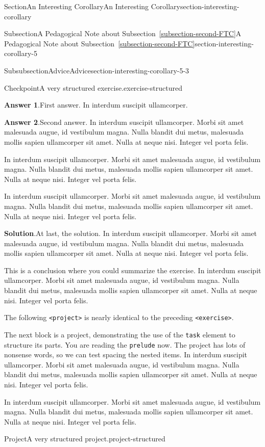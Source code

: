 \documentclass[twoside,10pt,]{article}
\newcommand{\blocktitlefont}{\relax}
\newcommand{\xreffont}{\relax}
\newcommand{\mono}[1]{\texttt{#1}}
\numberwithin{equation}{section}
\begin{document}
\begin{sectionptx}{Section}{An Interesting Corollary}{}{An Interesting Corollary}{}{}{section-interesting-corollary}
\begin{subsectionptx}{Subsection}{A Pedagogical Note about Subsection~{\xreffont\ref*{subsection-second-FTC}}}{}{A Pedagogical Note about Subsection~{\xreffont\ref*{subsection-second-FTC}}}{}{}{section-interesting-corollary-5}
\begin{subsubsectionptx}{Subsubsection}{Advice}{}{Advice}{}{}{section-interesting-corollary-5-3}
\begin{inlineexercise}{Checkpoint}{A very structured exercise.}{exercise-structured}
\begin{enumerate}[font=\bfseries,label=(\alph*),ref=\alph*]
\noindent\textbf{\blocktitlefont Answer 1}.\hypertarget{exercise-structured-6-3}{}\quad{}First answer.  In interdum suscipit ullamcorper.%
\par\smallskip%
\noindent\textbf{\blocktitlefont Answer 2}.\hypertarget{exercise-structured-6-4}{}\quad{}Second answer.  In interdum suscipit ullamcorper. Morbi sit amet malesuada augue, id vestibulum magna. Nulla blandit dui metus, malesuada mollis sapien ullamcorper sit amet. Nulla at neque nisi. Integer vel porta felis.%
\par
In interdum suscipit ullamcorper. Morbi sit amet malesuada augue, id vestibulum magna. Nulla blandit dui metus, malesuada mollis sapien ullamcorper sit amet. Nulla at neque nisi. Integer vel porta felis.%
\par
In interdum suscipit ullamcorper. Morbi sit amet malesuada augue, id vestibulum magna. Nulla blandit dui metus, malesuada mollis sapien ullamcorper sit amet. Nulla at neque nisi. Integer vel porta felis.%
\par\smallskip%
\noindent\textbf{\blocktitlefont Solution}.\hypertarget{exercise-structured-6-5}{}\quad{}At last, the solution.  In interdum suscipit ullamcorper. Morbi sit amet malesuada augue, id vestibulum magna. Nulla blandit dui metus, malesuada mollis sapien ullamcorper sit amet. Nulla at neque nisi. Integer vel porta felis.%
\end{enumerate}%
This is a conclusion where you could summarize the exercise.  In interdum suscipit ullamcorper. Morbi sit amet malesuada augue, id vestibulum magna. Nulla blandit dui metus, malesuada mollis sapien ullamcorper sit amet. Nulla at neque nisi. Integer vel porta felis.%
\end{inlineexercise}%
The following \mono{<project>} is nearly identical to the preceding \mono{<exercise>}.%
\par
The next block is a project, demonstrating the use of the \mono{task} element to structure its parts.  You are reading the \mono{prelude} now.  The project has lots of nonsense words, so we can test spacing the nested items.  In interdum suscipit ullamcorper. Morbi sit amet malesuada augue, id vestibulum magna. Nulla blandit dui metus, malesuada mollis sapien ullamcorper sit amet. Nulla at neque nisi. Integer vel porta felis.%
\par
In interdum suscipit ullamcorper. Morbi sit amet malesuada augue, id vestibulum magna. Nulla blandit dui metus, malesuada mollis sapien ullamcorper sit amet. Nulla at neque nisi. Integer vel porta felis.%
\begin{project}{Project}{A very structured project.}{project-structured}%

\end{project}
\end{subsubsectionptx}
\end{subsectionptx}
\end{sectionptx}
\end{document}
